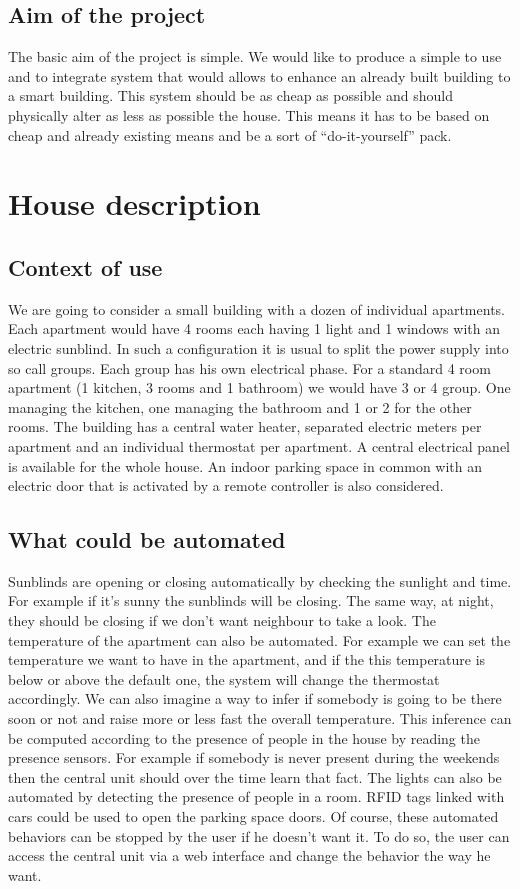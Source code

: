 \documentclass{acm_proc_article-sp}
\begin{document}
\subsection{Aim of the project}
The basic aim of the project is simple.
We would like to produce a simple to use and to integrate system that would allows to enhance an already built building to a smart building. 
This system should be as cheap as possible and should physically alter as less as possible the house. 
This means it has to be based on cheap and already existing means and be a sort of “do-it-yourself” pack.

\section{House description}
\subsection{Context of use}
We are going to consider a small building with a dozen of individual apartments. 
Each apartment would have 4 rooms each having 1 light and 1 windows with an electric sunblind. 
In such a configuration it is usual to split the power supply into so call groups. 
Each group has his own electrical phase. 
For a standard 4 room apartment (1 kitchen, 3 rooms and 1 bathroom) we would have 3 or 4 group. One managing the kitchen, one managing the bathroom and 1 or 2 for the other rooms. 
The building has a central water heater, separated electric meters per apartment and an individual thermostat per apartment. 
A central electrical panel is available for the whole house. An indoor parking space in common with an electric door that is activated by a remote controller is also considered.
\subsection{What could be automated}
Sunblinds are opening or closing automatically by checking the sunlight and time. 
For example if it's sunny the sunblinds will be closing. The same way, at night, they should be closing if we don't want neighbour to take a look.
The temperature of the apartment can also be automated. For example we can set the temperature we want to have in the apartment, 
and if the this temperature is below or above the default one, the system will change the thermostat accordingly. 
We can also imagine a way to infer if somebody is going to be there soon or not and raise more or less fast the overall temperature. 
This inference can be computed according to the presence of people in the house by reading the presence sensors. 
For example if somebody is never present during the weekends then the central unit should over the time learn that fact.
The lights can also be automated by detecting the presence of people in a room.
RFID tags linked with cars could be used to open the parking space doors.
Of course, these automated behaviors can be stopped by the user if he doesn't want it. 
To do so, the user can access the central unit via a web interface and change the behavior the way he want.
\end{document}
